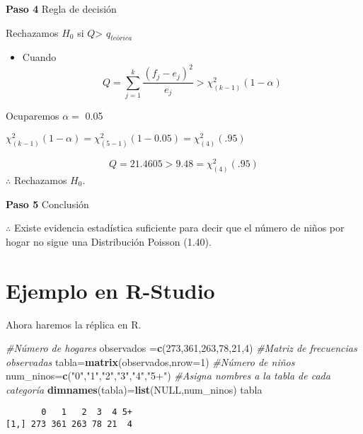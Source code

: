 \documentclass[
  a4paper,
  oneside,
  openany]{book}
\newenvironment{Shaded}{\begin{snugshade}}{\end{snugshade}}
\newcommand{\CommentTok}[1]{\textcolor[rgb]{0.56,0.35,0.01}{\textit{#1}}}
\newcommand{\DataTypeTok}[1]{\textcolor[rgb]{0.13,0.29,0.53}{#1}}
\newcommand{\DecValTok}[1]{\textcolor[rgb]{0.00,0.00,0.81}{#1}}
\newcommand{\KeywordTok}[1]{\textcolor[rgb]{0.13,0.29,0.53}{\textbf{#1}}}
\newcommand{\NormalTok}[1]{#1}
\newcommand{\OtherTok}[1]{\textcolor[rgb]{0.56,0.35,0.01}{#1}}
\newcommand{\StringTok}[1]{\textcolor[rgb]{0.31,0.60,0.02}{#1}}
\providecommand{\tightlist}{%
  \setlength{\itemsep}{0pt}\setlength{\parskip}{0pt}}
\begin{document}
\textbf{Paso 4} Regla de decisión

Rechazamos \(H_0\) si \(Q\)\textgreater{} \(q_{teórica}\)

\begin{itemize}
\tightlist
\item
  Cuando \[Q= \sum_{j=1}^{k}\frac{(f_{j}-e_{j})^2}{e_{j}} > \chi^2_{(k-1)}(1-\alpha)\]
\end{itemize}

Ocuparemos \(\alpha=\) 0.05

\(\chi^2_{(k-1)}(1-\alpha)=\chi^2_{(5-1)}(1-0.05) =\chi^2_{(4)}(.95)\)

\[ Q=21.4605 > 9.48= \chi^2_{(4)}(.95)\]
\(\therefore\) Rechazamos \(H_0\).

\textbf{Paso 5} Conclusión

\(\therefore\) Existe evidencia estadística suficiente para decir que el número de niños por hogar no sigue una Distribución Poisson (1.40).

\hypertarget{ejemplo-en-r-studio-13}{%
\section{Ejemplo en R-Studio}\label{ejemplo-en-r-studio-13}}

Ahora haremos la réplica en R.

\begin{Shaded}
\begin{Highlighting}[]
\CommentTok{\#Número de hogares}
\NormalTok{observados =}\KeywordTok{c}\NormalTok{(}\DecValTok{273}\NormalTok{,}\DecValTok{361}\NormalTok{,}\DecValTok{263}\NormalTok{,}\DecValTok{78}\NormalTok{,}\DecValTok{21}\NormalTok{,}\DecValTok{4}\NormalTok{) }
\CommentTok{\#Matriz de frecuencias observadas}
\NormalTok{tabla=}\KeywordTok{matrix}\NormalTok{(observados,}\DataTypeTok{nrow=}\DecValTok{1}\NormalTok{)}
\CommentTok{\#Número de niños}
\NormalTok{num\_ninos=}\KeywordTok{c}\NormalTok{(}\StringTok{"0"}\NormalTok{,}\StringTok{"1"}\NormalTok{,}\StringTok{"2"}\NormalTok{,}\StringTok{"3"}\NormalTok{,}\StringTok{"4"}\NormalTok{,}\StringTok{"5+"}\NormalTok{)}
\CommentTok{\#Asigna nombres a la tabla de cada categoría}
\KeywordTok{dimnames}\NormalTok{(tabla)=}\KeywordTok{list}\NormalTok{(}\OtherTok{NULL}\NormalTok{,num\_ninos)}
\NormalTok{tabla}
\end{Highlighting}
\end{Shaded}

\begin{verbatim}
       0   1   2  3  4 5+
[1,] 273 361 263 78 21  4
\end{verbatim}
\end{document}
